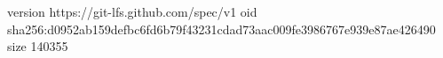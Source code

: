 version https://git-lfs.github.com/spec/v1
oid sha256:d0952ab159defbc6fd6b79f43231cdad73aac009fe3986767e939e87ae426490
size 140355
